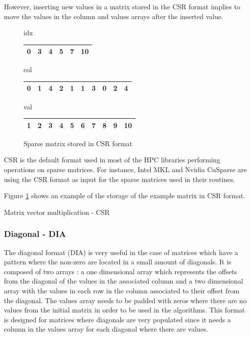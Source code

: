 However, inserting new values in a matrix stored in the CSR format implies to move the values in the column and values arrays after the inserted value.


\begin{figure}[h]
\centering
idx
\bigskip
\begin{tabular}{|cccccc|}
\hline
0 & 3 & 4 & 5 & 7 & 10 \\
\hline
\end{tabular}

col
\bigskip
\begin{tabular}{|cccccccccc|}
\hline
0 & 1 & 4 & 2 & 1 & 1 & 3 & 0 & 2 & 4 \\
\hline
\end{tabular}

val
\bigskip
\begin{tabular}{|cccccccccc|}
\hline
1 & 2 & 3 & 4 & 5 & 6 & 7 & 8 & 9 & 10 \\
\hline
\end{tabular}
\caption{Sparse matrix stored in CSR format \label{fig:methods:csr_ex}}
\end{figure}

CSR is the default format used in most of the HPC libraries performing operations on sparse matrices.
For instance, Intel MKL and Nvidia CuSparse are using the CSR format as input for the sparse matrices used in their routines.

Figure \ref{fig:methods:csr_ex} shows an example of the storage of the example matrix in CSR format.


\begin{algorithm}[h]
	\DontPrintSemicolon
	\caption{Matrix vector multiplication - CSR\label{fig:methods:csr_algo}}
\end{algorithm}


\subsubsection{Diagonal - DIA}
The diagonal format (DIA) is very useful in the case of matrices which have a pattern where the non-zero are located in a small amount of diagonals.
It is composed of two arrays : a one dimensional array which represents the offsets from the diagonal of the values in the associated column and a two dimensional array with the values in each row in the column associated to their offset from the diagonal.
The values array needs to be padded with zeros where there are no values from the initial matrix in order to be used in the algorithms.
This format is designed for matrices where diagonals are very populated since it needs a column in the values array for each diagonal where there are values.

